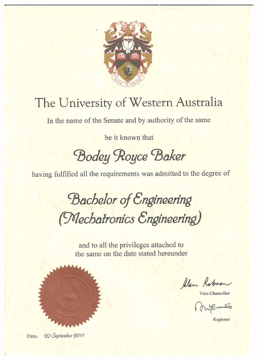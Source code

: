 \documentclass[10pt, a4paper]{report}
\begin{document}
\begin{figure}[h!]
   \centering
   \includegraphics[height=1.08\vsize]{images/a_deg_me.jpg} 
\end{figure}
\end{document}
